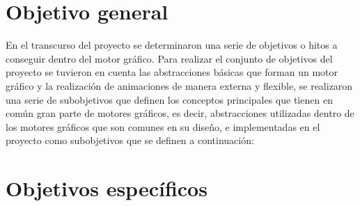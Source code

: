 \documentclass[a4paper]{book}
\begin{document}
\section{Objetivo general}
\label{sec:objetivo-general}

En el transcurso del proyecto se determinaron una serie de objetivos o hitos a conseguir dentro del motor gráfico.
Para realizar el conjunto de objetivos del proyecto se tuvieron en cuenta las abstracciones básicas que forman
un motor gráfico y la realización de animaciones de manera externa y flexible, se realizaron una serie de
subobjetivos que definen los conceptos principales que tienen en común gran parte de motores gráficos, es decir,
abstracciones utilizadas dentro de los motores gráficos que son comunes en su diseño, e implementadas en el
proyecto como subobjetivos que se definen a continuación:

\section{Objetivos específicos}
\label{sec:objetivos-especificos}
\end{document}
